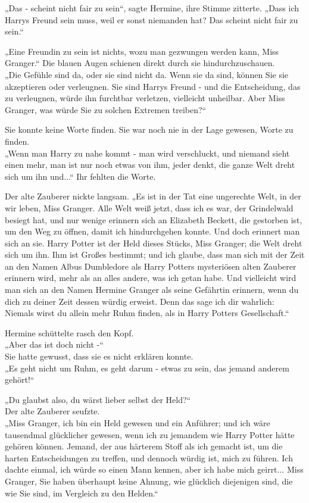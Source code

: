 {„Das - scheint nicht fair zu sein“, sagte Hermine, ihre Stimme zitterte. „Dass ich Harrys Freund sein muss, weil er sonst niemanden hat? Das scheint nicht fair zu sein.“

„Eine Freundin zu sein ist nichts, wozu man gezwungen werden kann, Miss Granger.“ Die blauen Augen schienen direkt durch sie hindurchzuschauen.\\ „Die Gefühle sind da, oder sie sind nicht da. Wenn sie da sind, können Sie sie akzeptieren oder verleugnen. Sie sind Harrys Freund - und die Entscheidung, das zu verleugnen, würde ihn furchtbar verletzen, vielleicht unheilbar. Aber Miss Granger, was würde Sie zu solchen Extremen treiben?“

Sie konnte keine Worte finden. Sie war noch nie in der Lage gewesen, Worte zu finden.\\ „Wenn man Harry zu nahe kommt - man wird verschluckt, und niemand sieht einen mehr, man ist nur noch etwas von ihm, jeder denkt, die ganze Welt dreht sich um ihn und...“ Ihr fehlten die Worte.

Der alte Zauberer nickte langsam. „Es ist in der Tat eine ungerechte Welt, in der wir leben, Miss Granger. Alle Welt weiß jetzt, dass ich es war, der Grindelwald besiegt hat, und nur wenige erinnern sich an Elizabeth Beckett, die gestorben ist, um den Weg zu öffnen, damit ich hindurchgehen konnte. Und doch erinnert man sich an sie. Harry Potter ist der Held dieses Stücks, Miss Granger; die Welt dreht sich um ihn. Ihm ist Großes bestimmt; und ich glaube, dass man sich mit der Zeit an den Namen Albus Dumbledore als Harry Potters mysteriösen alten Zauberer erinnern wird, mehr als an alles andere, was ich getan habe. Und vielleicht wird man sich an den Namen Hermine Granger als seine Gefährtin erinnern, wenn du dich zu deiner Zeit dessen würdig erweist. Denn das sage ich dir wahrlich: Niemals wirst du allein mehr Ruhm finden, als in Harry Potters Gesellschaft.“

Hermine schüttelte rasch den Kopf.\\ „Aber das ist doch nicht -“\\ Sie hatte gewusst, dass sie es nicht erklären konnte.\\ „Es geht nicht um Ruhm, es geht darum - etwas zu sein, das jemand anderem gehört!“

„Du glaubst also, du wärst lieber selbst der Held?“\\ Der alte Zauberer seufzte.\\ „Miss Granger, ich bin ein Held gewesen und ein Anführer; und ich wäre tausendmal glücklicher gewesen, wenn ich zu jemandem wie Harry Potter hätte gehören können. Jemand, der aus härterem Stoff als ich gemacht ist, um die harten Entscheidungen zu treffen, und dennoch würdig ist, mich zu führen. Ich dachte einmal, ich würde so einen Mann kennen, aber ich habe mich geirrt... Miss Granger, Sie haben überhaupt keine Ahnung, wie glücklich diejenigen sind, die wie Sie sind, im Vergleich zu den Helden.“

}
